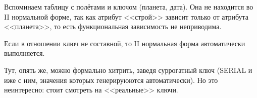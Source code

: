 	\begin{exmp}
		Вспоминаем таблицу с полётами и ключом (планета, дата).
		Она не находится во II нормальной форме, так как атрибут <<строй>> зависит только
		от атрибута <<планета>>, то есть функциональная зависимость не неприводима.
	\end{exmp}
	\begin{Rem}
		Если в отношении ключ не составной, то II нормальная форма автоматически выполняется.
	\end{Rem}
	\begin{Rem}
		Тут, опять же, можно формально хитрить, заведя суррогатный ключ (SERIAL и иже с ним, значения которых генерируюются автоматически).
		Но это неинтересно: стоит смотреть на <<реальные>> ключи.
	\end{Rem}
